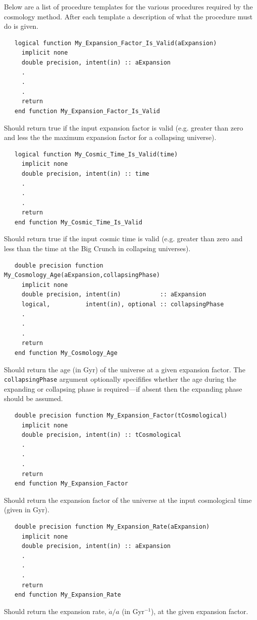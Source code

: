 Below are a list of procedure templates for the various procedures required by the cosmology method. After each template a description of what the procedure must do is given.

\begin{verbatim}
   logical function My_Expansion_Factor_Is_Valid(aExpansion)
     implicit none
     double precision, intent(in) :: aExpansion
     .
     .
     .
     return
   end function My_Expansion_Factor_Is_Valid
\end{verbatim}
Should return true if the input expansion factor is valid (e.g. greater than zero and less the the maximum expansion factor for a collapsing universe).

\begin{verbatim}
   logical function My_Cosmic_Time_Is_Valid(time)
     implicit none
     double precision, intent(in) :: time
     .
     .
     .
     return
   end function My_Cosmic_Time_Is_Valid
\end{verbatim}
Should return true if the input cosmic time is valid (e.g. greater than zero and less than the time at the Big Crunch in collapsing universes).

\begin{verbatim}
   double precision function My_Cosmology_Age(aExpansion,collapsingPhase)
     implicit none
     double precision, intent(in)           :: aExpansion
     logical,          intent(in), optional :: collapsingPhase
     .
     .
     .
     return
   end function My_Cosmology_Age
\end{verbatim}
Should return the age (in Gyr) of the universe at a given expansion factor. The {\tt collapsingPhase} argument optionally specififies whether the age during the expanding or collapsing phase is required---if absent then the expanding phase should be assumed.

\begin{verbatim}
   double precision function My_Expansion_Factor(tCosmological)
     implicit none
     double precision, intent(in) :: tCosmological
     .
     .
     .
     return
   end function My_Expansion_Factor
\end{verbatim}
Should return the expansion factor of the universe at the input cosmological time (given in Gyr).

\begin{verbatim}
   double precision function My_Expansion_Rate(aExpansion)
     implicit none
     double precision, intent(in) :: aExpansion
     .
     .
     .
     return
   end function My_Expansion_Rate
\end{verbatim}
Should return the expansion rate, $\dot{a}/a$ (in Gyr$^{-1}$), at the given expansion factor.


